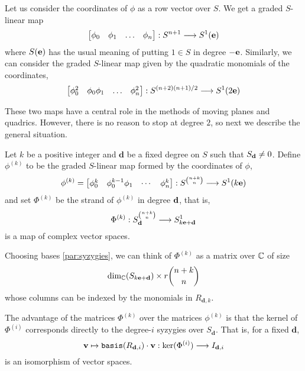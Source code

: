 \documentclass[fleqn,reqno]{amsart}
\begin{document}
\begin{paragraf}
\label{par:all-phi-k}
Let us consider the coordinates of $\phi$ as a row vector over $S$. We get a graded $S$-linear map
\[
\begin{bmatrix}
	\phi_0& \phi_1& \ldots& \phi_n
\end{bmatrix}:S^{n+1}\longrightarrow S^1(\mathbf e)
\]
where $S(\mathbf e)$ has the usual meaning of putting $1\in S$ in degree $-\mathbf e$.
Similarly, we can consider the graded $S$-linear map given by the quadratic monomials
of the coordinates,
\[
\begin{bmatrix}
	\phi_0^2& \phi_0\phi_1& \ldots& \phi_n^2
\end{bmatrix}:S^{(n+2)(n+1)/2}\longrightarrow S^1(2\mathbf e)
\]

These two maps have a central role in the methods of moving planes and quadrics.
However, there is no reason to stop at degree $2$,
so next we describe the general situation.
\end{paragraf}

\begin{paragraf}
\label{par:strands}
Let $k$ be a positive integer and $\mathbf d$ be a fixed degree on $S$ such that $S_\mathbf d\neq0$.
Define $\phi^{(k)}$ to be the graded $S$-linear map formed by the coordinates of $\phi$,
\[
\phi^{(k)}=\begin{bmatrix}\phi_0^k& \phi_0^{k-1}\phi_1& \cdots& \phi_n^k\end{bmatrix}:
S^{\binom{n+k}{n}}\longrightarrow S^1(k\mathbf e)
\]
and set $\Phi^{(k)}$ be the strand of $\phi^{(k)}$ in degree $\mathbf d$, that is,
\[
\Phi^{(k)}:S_{\mathbf d}^{\binom{n+k}{n}}\longrightarrow S_{k\mathbf e+\mathbf d}^1
\]
is a map of complex vector spaces.

Choosing bases \eqref{par:syzygies}, we can think of $\Phi^{(k)}$ as a matrix over $\mathbb{C}$ of size
\[
\dim_{\mathbb{C}}(S_{k\mathbf e+\mathbf d})\times r\binom{n+k}{n}
\]
whose columns can be indexed by the monomials in $R_{\mathbf d,k}$.
\end{paragraf}

\begin{paragraf}
\label{par:syzygies-kernel}
The advantage of the matrices $\Phi^{(k)}$ over the matrices $\phi^{(k)}$
is that the kernel of $\Phi^{(i)}$ corresponds directly to the degree-$i$ syzygies over $S_{\mathbf d}$.
That is, for a fixed $\mathbf d$,
\[
\mathbf v\mapsto\mathop{\tt basis}(R_{\mathbf d,i})\cdot \mathbf v:\ker(\Phi^{(i)})\longrightarrow I_{\mathbf d, i}
\]
is an isomorphism of vector spaces.
\end{paragraf}
\end{document}
